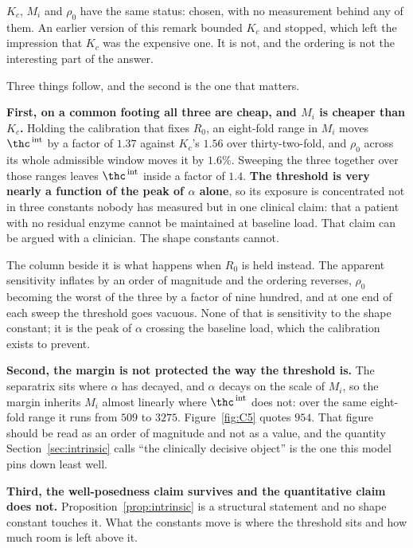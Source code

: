 \begin{remark}
\label{rem:shape}
$K_c$, $M_i$ and $\rho_0$ have the same status: chosen, with no measurement behind any of
them. An earlier version of this remark bounded $K_c$ and stopped, which left the impression
that $K_c$ was the expensive one. It is not, and the ordering is not the interesting part
of the answer.

\begin{center}
\scriptsize

\end{center}

Three things follow, and the second is the one that matters.

\textbf{First, on a common footing all three are cheap, and $M_i$ is cheaper than $K_c$.}
Holding the calibration that fixes $R_0$, an eight-fold range in $M_i$ moves
$\thc^{\,\mathrm{int}}$ by a factor of $1.37$ against $K_c$'s $1.56$ over thirty-two-fold,
and $\rho_0$ across its whole admissible window moves it by $1.6\%$. Sweeping the three
together over those ranges leaves $\thc^{\,\mathrm{int}}$ inside a factor of $1.4$.
\textbf{The threshold is very nearly a function of the peak of $\alpha$ alone}, so its
exposure is concentrated not in three constants nobody has measured but in one clinical
claim: that a patient with no residual enzyme cannot be maintained at baseline load. That
claim can be argued with a clinician. The shape constants cannot.

The column beside it is what happens when $R_0$ is held instead. The apparent sensitivity
inflates by an order of magnitude and the ordering reverses, $\rho_0$ becoming the worst of
the three by a factor of nine hundred, and at one end of each sweep the threshold goes
vacuous. None of that is sensitivity to the shape constant; it is the peak of $\alpha$
crossing the baseline load, which the calibration exists to prevent.

\textbf{Second, the margin is not protected the way the threshold is.} The separatrix sits
where $\alpha$ has decayed, and $\alpha$ decays on the scale of $M_i$, so the margin
inherits $M_i$ almost linearly where $\thc^{\,\mathrm{int}}$ does not: over the same
eight-fold range it runs from $509$ to $3275$. Figure~\ref{fig:C5} quotes $954$. That figure
should be read as an order of magnitude and not as a value, and the quantity
Section~\ref{sec:intrinsic} calls ``the clinically decisive object'' is the one this model
pins down least well.

\textbf{Third, the well-posedness claim survives and the quantitative claim does not.}
Proposition~\ref{prop:intrinsic} is a structural statement and no shape constant touches it.
What the constants move is where the threshold sits and how much room is left above it.
\end{remark}

